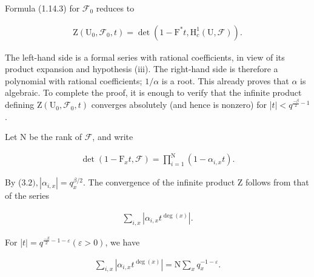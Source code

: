 \documentclass[10pt,leqno]{article}
\begin{document}
\noindent Formula (1.14.3) for \(\mathcal{F} _{0}\) reduces to\par

\begin{equation*}\begin{gathered}\mathrm{Z}(\mathrm{U}_{0},\mathcal{F} _{0},t) = \operatorname{det}(1- \mathrm{F}^{*}t,\mathrm{H}_{c}^{1}(\mathrm{U},\mathcal{F} )).\end{gathered}\end{equation*}

\noindent The left-hand side is a formal series with rational coefficients, in view of its product expansion and hypothesis (iii). The right-hand side is therefore a polynomial with rational coefficients; \(1/\alpha \) is a root. This already proves that \(\alpha \) is algebraic. To complete the proof, it is enough to verify that the infinite product defining \(\mathrm{Z}(\mathrm{U}_{0},\mathcal{F} _{0},t)\) converges absolutely (and hence is nonzero) for |\(t|<q^{\frac{-\beta}{2}- 1}\).\par

\noindent Let \(\mathrm{N}\) be the rank of \(\mathcal{F} \), and write\par

\begin{equation*}\begin{gathered}\operatorname{det}(1- \mathrm{F}_{x} t,\mathcal{F} ) = \prod _{i=1}^{\mathrm{N}} (1- \alpha _{i,x}t).\end{gathered}\end{equation*}

\noindent By (\(3.2), |\alpha _{i,x}|=q_{x}^{\beta /2}\). The convergence of the infinite product \(\mathrm{Z}\) follows from that of the series\par

\begin{equation*}\begin{gathered}\sum _{i,x} |\alpha _{i,x}t^{\operatorname{deg}(x)}|.\end{gathered}\end{equation*}

\noindent For |\(t|=q^{\frac{-\beta}{2}- 1- \varepsilon } (\varepsilon >0)\), we have\par

\begin{equation*}\begin{gathered}\sum _{i,x} |\alpha _{i,x}t^{\operatorname{deg}(x)}| = \mathrm{N}\sum _{x} q_{x}^{- 1- \varepsilon }.\end{gathered}\end{equation*}
\end{document}
